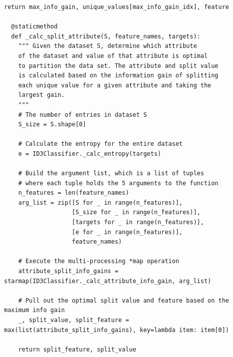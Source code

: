 \documentclass[a4paper]{article}
\begin{document}
\begin{lstlisting}[basicstyle= \scriptsize]
    return max_info_gain, unique_values[max_info_gain_idx], feature

  @staticmethod
  def _calc_split_attribute(S, feature_names, targets):
    """ Given the dataset S, determine which attribute
    of the dataset and value of that attribute is optimal 
    to partition the data set. The attribute and split value
    is calculated based on the information gain of splitting
    each unique value for a given attribute and taking the 
    largest gain.
    """
    # The number of entries in dataset S
    S_size = S.shape[0]

    # Calculate the entropy for the entire dataset
    e = ID3Classifier._calc_entropy(targets)

    # Build the argument list, which is a list of tuples
    # where each tuple holds the 5 arguments to the function
    n_features = len(feature_names)
    arg_list = zip([S for _ in range(n_features)],
                   [S_size for _ in range(n_features)],
                   [targets for _ in range(n_features)],
                   [e for _ in range(n_features)],
                   feature_names)
    
    # Execute the multi-processing *map operation
    attribute_split_info_gains = starmap(ID3Classifier._calc_attribute_info_gain, arg_list)

    # Pull out the optimal split value and feature based on the maximum info gain
    _, split_value, split_feature = max(list(attribute_split_info_gains), key=lambda item: item[0])

    return split_feature, split_value
\end{lstlisting}
\end{document}
